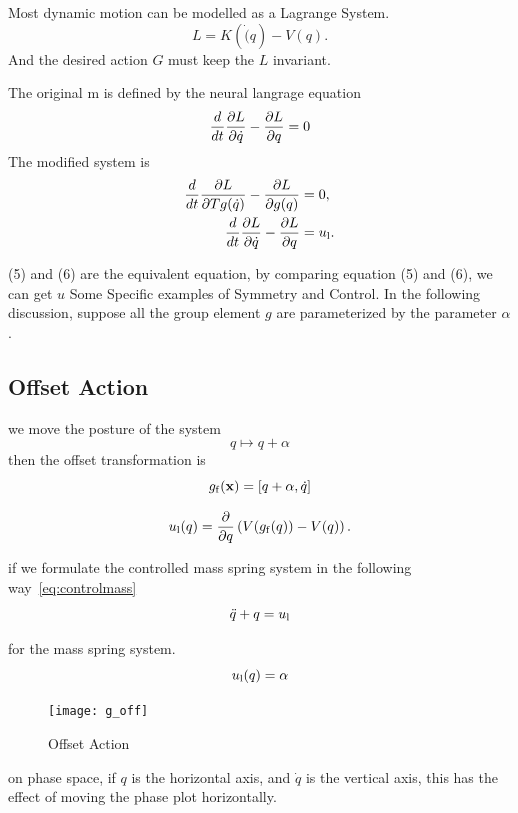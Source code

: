 Most dynamic motion can be modelled as a Lagrange System. 
\[
L=K(\dot(q)-V(q).
\]
And the desired action $G$ must keep the $L$ invariant. 

The original m is defined by the neural langrage equation
\begin{equation}
\frac{d}{dt} \frac{\partial L}{\partial \dot{q}} - \frac{\partial L}{\partial q} = 0
\label{eq:uncontrolled_euler_lagrange}
\end{equation}
The modified system is 
\begin{align}
\frac{d}{dt} \frac{\partial L}{\partial Tg(\dot{q})} - \frac{\partial L}{\partial g(q)}&=0,\label{eq:liegroup_euler_lagrange}\\
\frac{d}{dt} \frac{\partial L}{\partial \dot{q}} - \frac{\partial L}{\partial q}&=u_{\mathrm{l}}. \label{eq:controlled_euler_lagrange}
\end{align}


(5) and (6) are the equivalent equation, by comparing  equation (5) and (6), we can get $u$
Some Specific examples of Symmetry and Control.
In the following discussion, suppose all the group element $g$ are parameterized by the parameter $\alpha$.

\subsection*{ Offset Action}
we move the posture of the system 
\[
q \mapsto q+\alpha
\]
then the offset transformation is
\[
g_{\mathrm{f}}(\mathbf{x}) = [q+\alpha,\dot{q}]
\]


\begin{equation}
u_{\mathrm{l}}(q) = \frac{\partial}{\partial q} \left(V(g_{\mathrm{f}}(q)) - V(q)\right).
\end{equation}

if we formulate the controlled mass spring system in the following way~\ref{eq:controlmass}
\begin{equation}
\label{eq:controlmass}
\ddot{q}+q=u_{\mathrm{l}}
\end{equation}

for the mass spring system.
\[
u_{\mathrm{l}}(q)=\alpha
\]

\begin{figure}[!htbp]
  \begin{center}
      \texttt{[image: g\_off]}
    \caption{Offset Action}
    \label{fig:goff}
\end{center}
\end{figure}
on phase space, if $q$ is the horizontal axis, and $\dot{q}$ is the vertical axis, this has the effect of moving the phase plot horizontally.

